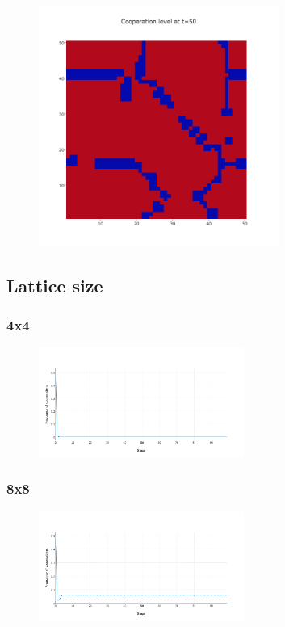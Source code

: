 \documentclass[11pt]{article}
\begin{document}
\begin{figure}[H]
\centering
   \includegraphics[width=0.7\textwidth]{img/part1/cf-moore-visu-50.png}
\end{figure}

\subsection{Lattice size}

\subsubsection{4x4}

\begin{figure}[H]
\centering
   \includegraphics[width=0.6\textwidth]{img/part1/cf-moore-4-4.png}
\end{figure}

\subsubsection{8x8}

\begin{figure}[H]
\centering
   \includegraphics[width=0.6\textwidth]{img/part1/cf-moore-8-8.png}
\end{figure}
\end{document}

